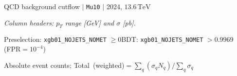 \documentclass[10pt,a4paper]{article}
\begin{document}
\begin{landscape}

{\large QCD background cutflow $|$ \texttt{Mu10} $|$ 2024, $13.6\,\mathrm{TeV}$}

\vspace{0.8em}

\textit{Column headers: $p_T$ range [GeV] and $\sigma$ [pb].}

Preselection: \texttt{xgb01\_NOJETS\_NOMET} $\geq 0$\quad BDT: \texttt{xgb01\_NOJETS\_NOMET} $>0.9969$ (FPR$=10^{-4}$)

\vspace{0.8em}

\vspace{18pt}

Absolute event counts; Total\ (weighted)$=\sum_q(\sigma_q N_q)/\sum_q\sigma_q$


\end{landscape}
\end{document}
